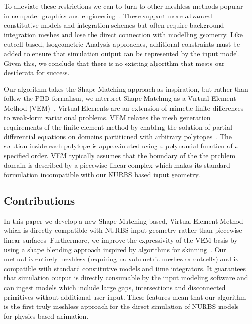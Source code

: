 To alleviate these restrictions we can to turn to other meshless methods popular in computer graphics and 
engineering~\cite{10.1145/1028523.1028542,https://doi.org/10.1002/fld.1650200824,10.1145/1778765.1778776,10.1145/2010324.1964968, 10.1145/1944846.1944855}.
These support more advanced constitutive models and integration schemes but often require background integration meshes and lose the direct connection with
modelling geometry. 
Like cutcell-based, Isogeometric Analysis approaches, additional constraints must be added to ensure that simulation output can be represented by the input model.
Given this, we conclude that there is no existing algorithm that meets our desiderata for success. 

Our algorithm takes the Shape Matching approach as inspiration, but rather than follow the PBD formalism, we interpret Shape Matching as a 
Virtual Element Method (VEM)~\cite{10.1142/S0218202512500492,10.1142/S021820251440003X}. Virtual Elements are an extension of 
mimetic finite differences~\cite{10.1142/S0218202505000832,10.1016/j.jcp.2013.07.031} to weak-form variational problems. 
VEM relaxes the mesh generation requirements of the finite element method by enabling the solution of partial differential equations
on domains partitioned with arbitrary polytopes~\cite{10.1145/3386569.3392389}. 
The solution inside each polytope is approximated using a polynomial function of a specified order.
VEM typically assumes that the boundary of the the problem domain is described by a piecewise linear complex
which makes its standard formulation incompatible with our NURBS based input geometry. 


\subsection*{Contributions} 
In this paper we develop a new Shape Matching-based, Virtual Element Method which is directly compatible 
with NURBS input geometry rather than piecewise linear surfaces. 
Furthermore, we improve the expressivity of the VEM basis by using a shape blending approach inspired by
algorithms for skinning~\cite{skinningcourse:2014}.
Our method is entirely meshless (requiring no volumetric meshes or cutcells) and is compatible with standard constitutive models and time integrators.
It guarantees that simulation output is directly consumable by the input modeling software and can ingest models which include large gaps,
intersections and disconnected primitives without additional user input. 
These features mean that our algorithm is the first truly meshless approach for the direct simulation of NURBS models for physics-based animation.

